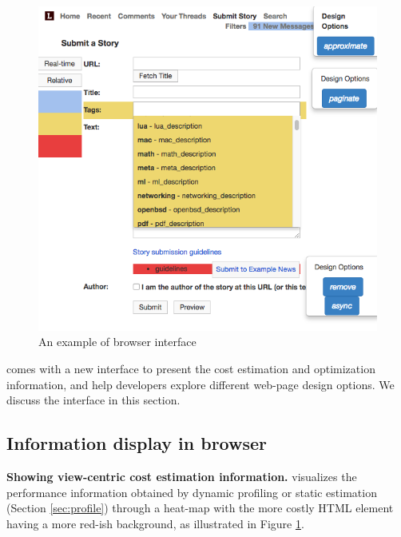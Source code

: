 \label{sec:im}
\begin{figure}
    \centering
   
    \includegraphics[width=\columnwidth]{panorama-figs/heatmap.png}
    \vspace{-0.1in}
    \caption{An example of \Tool browser interface}
    \label{fig:heatmap}
     \vspace{-0.2in}
\end{figure}


\Tool comes with a new interface to present the cost estimation and optimization information, and help developers explore different web-page design options. We discuss the \Tool interface in this section.



\subsection{Information display in browser}
\label{sec:ide_browser}
\textbf{Showing view-centric cost estimation information.}
\Tool visualizes the performance information obtained by dynamic profiling or 
static estimation (Section \ref{sec:profile}) through a heat-map with the more costly
HTML element having a more red-ish background, as illustrated in
Figure \ref{fig:heatmap}.


